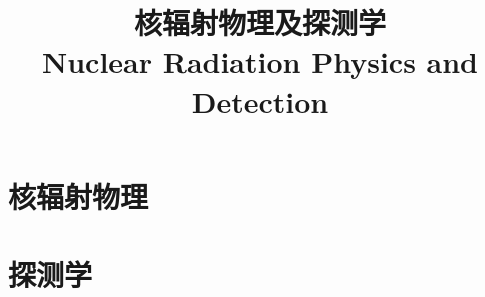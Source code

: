 \documentclass{../thunote}
\begin{document}
\title{核辐射物理及探测学\\Nuclear Radiation Physics and Detection}
\maketitle

\frontmatter
\tableofcontents



\mainmatter
\part{核辐射物理}







\part{探测学}








\appendix

\end{document}
